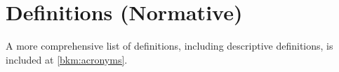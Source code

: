 %
%
\section{Definitions (Normative)} \label{bkm:definitionsabbreviations}


\printglossary[type=normative,style=altlist]

A more comprehensive list of definitions, including descriptive definitions, is included at \autoref{bkm:acronyms}.
